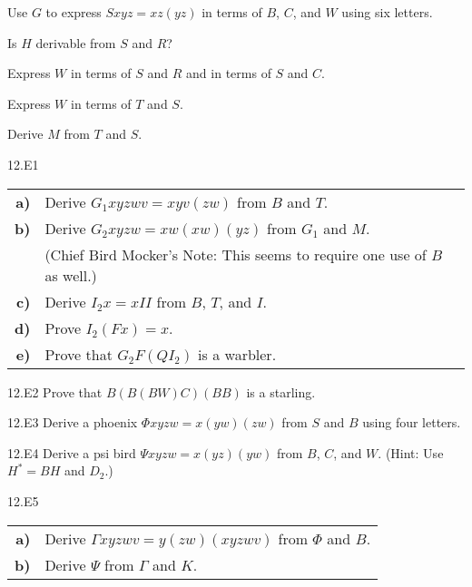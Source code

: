 \documentclass[12pt, letterpaper]{article}
\begin{document}
\begin{prob}{12.12}  
Use $G$ to express $Sxyz = xz(yz)$ in terms of $B$, $C$, and $W$ using six letters.
\end{prob}

\begin{prob}{12.13}  
Is $H$ derivable from $S$ and $R$?
\end{prob}

\begin{prob}{12.14} 
Express $W$ in terms of $S$ and $R$ and in terms of $S$ and $C$.
\end{prob}

\begin{prob}{12.15}  
Express $W$ in terms of $T$ and $S$.
\end{prob}

\begin{prob}{12.16}  
Derive $M$ from $T$ and $S$.
\end{prob}

\begin{prob}{12.E1} 
\end{prob}

\begin{tabular}{r l}
\textbf{a)} & Derive $G_1xyzwv = xyv(zw)$ from $B$ and $T$. \\
\textbf{b)} & Derive $G_2xyzw = xw(xw)(yz)$ from $G_1$ and $M$. \\
 & (Chief Bird Mocker's Note: This seems to require one use of $B$ as well.) \\
\textbf{c)} & Derive $I_2x = xII$ from $B$, $T$, and $I$. \\
\textbf{d)} & Prove $I_2(Fx) = x$. \\
\textbf{e)} & Prove that $G_2F(QI_2)$ is a warbler.
\end{tabular}

\begin{prob}{12.E2}  
Prove that $B(B(BW)C)(BB)$ is a starling.
\end{prob}

\begin{prob}{12.E3}  
Derive a phoenix $\Phi xyzw = x(yw)(zw)$ from $S$ and $B$ using four letters.
\end{prob}

\begin{prob}{12.E4}  
Derive a psi bird $\Psi xyzw = x(yz)(yw)$ from $B$, $C$, and $W$. (Hint: Use $H^* = BH$ and $D_2$.)
\end{prob}

\begin{prob}{12.E5} 
\end{prob}
\begin{tabular}{r l}
\textbf{a)} & Derive $\Gamma xyzwv = y(zw)(xyzwv)$ from $\Phi$ and $B$. \\
\textbf{b)} & Derive $\Psi$ from $\Gamma$ and $K$.
\end{tabular}
\end{document}
